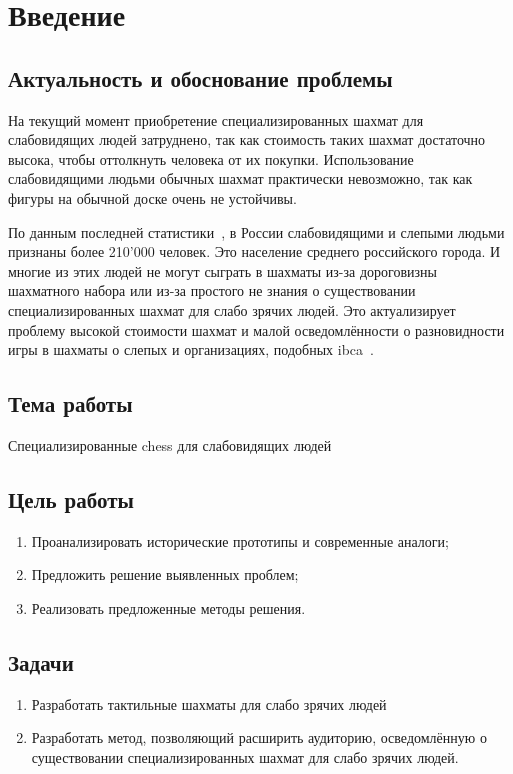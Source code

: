 \section{Введение}
\subsection{Актуальность и обоснование проблемы}
На текущий момент приобретение специализированных шахмат для слабовидящих людей
затруднено, так как стоимость таких шахмат достаточно высока, чтобы оттолкнуть
человека от их покупки. Использование слабовидящими людьми обычных шахмат
практически невозможно, так как фигуры на обычной доске очень не устойчивы. 

По данным последней статистики~\cite{web:min-educ}, в России слабовидящими и
слепыми людьми признаны более 210'000 человек. Это население среднего
российского города. И многие из этих людей не могут сыграть в шахматы из-за
дороговизны шахматного набора или из-за простого не знания о существовании
специализированных шахмат для слабо зрячих людей. Это актуализирует проблему
высокой стоимости шахмат и малой осведомлённости о  разновидности игры в
шахматы о слепых и организациях, подобных \acrshort{ibca}~\cite{web:wiki-ibca}.\@

\subsection{Тема работы}
Специализированные \gls{chess} для слабовидящих людей

\subsection{Цель работы}
\begin{enumerate}
    \item Проанализировать исторические прототипы и современные аналоги;
    \item Предложить решение выявленных проблем;
    \item Реализовать предложенные методы решения.
\end{enumerate}

\subsection{Задачи}
\begin{enumerate}
    \item Разработать тактильные шахматы для слабо зрячих людей
    \item Разработать метод, позволяющий расширить аудиторию, осведомлённую о
        существовании специализированных шахмат для слабо зрячих людей.
\end{enumerate}
\newpage
